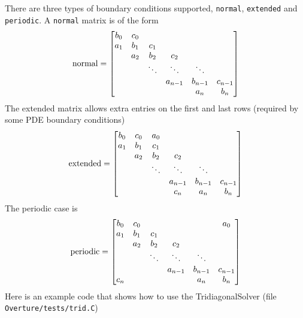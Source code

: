 There are three types of boundary conditions supported, {\tt normal}, {\tt extended} and
{\tt periodic}. A {\tt normal} matrix is of the form
\[
  {\rm normal } = 
        \begin{bmatrix}
               b_0 & c_0 &      &        &        &     \\
               a_1 & b_1 & c_1  &        &        &     \\
                   & a_2 & b_2  & c_2    &        &     \\
                   &     &\ddots&\ddots  & \ddots &      \\ 
                   &     &      & a_{n-1}& b_{n-1} & c_{n-1} \\
                   &     &      &        & a_n     & b_n 
        \end{bmatrix}
\]
The extended matrix allows extra entries on the first and last rows (required
by some PDE boundary conditions)
\[
  {\rm extended} = 
        \begin{bmatrix}
               b_0 & c_0 & a_0  &        &        &     \\
               a_1 & b_1 & c_1  &        &        &     \\
                   & a_2 & b_2  & c_2    &        &     \\
                   &     &\ddots&\ddots  & \ddots &      \\ 
                   &     &      & a_{n-1}& b_{n-1} & c_{n-1} \\
                   &     &      & c_n    & a_n     & b_n 
        \end{bmatrix}
\]
The periodic case is
\[
  {\rm periodic } = 
        \begin{bmatrix}
               b_0 & c_0 &      &        &        & a_0 \\
               a_1 & b_1 & c_1  &        &        &     \\
                   & a_2 & b_2  & c_2    &        &     \\
                   &     &\ddots&\ddots  & \ddots &      \\ 
                   &     &      & a_{n-1}& b_{n-1} & c_{n-1} \\
              c_n  &     &      &        & a_n     & b_n 
        \end{bmatrix}
\]
Here is an example code that shows how to use the TridiagonalSolver
(file {\tt Overture/tests/trid.C})
